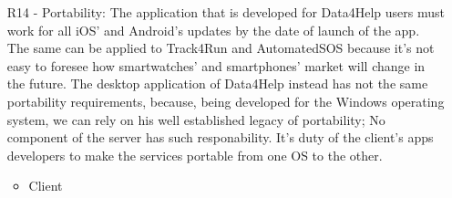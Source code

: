 \begin{itemize}
\item [R14] - Portability: The application that is developed for Data4Help users must work for all iOS’ and Android’s updates by the date of launch of the app. The same can be applied to Track4Run and AutomatedSOS because it’s not easy to foresee how smartwatches’ and smartphones’ market will change in the future. The desktop application of Data4Help instead has not the same portability requirements, because, being developed for the Windows operating system, we can rely on his well established legacy of portability;
No component of the server has such responability.
It's duty of the client's apps developers to make the services portable from one OS to the other.
\begin{itemize}
	\item Client
\end{itemize}



\end{itemize}